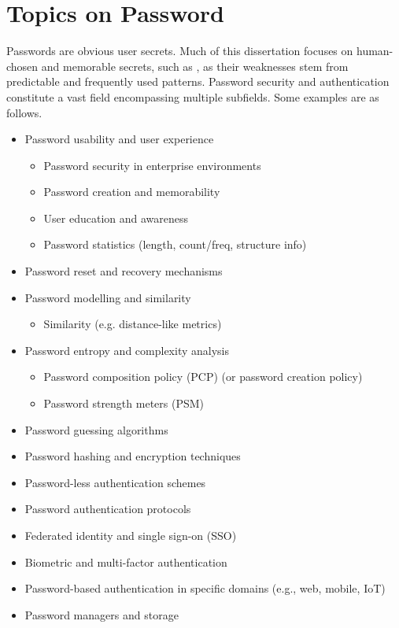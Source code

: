 \section{Topics on Password}
\label{sec::chp2::password}

Passwords are obvious user secrets. Much of this dissertation focuses on human-chosen and memorable secrets, such as , as their weaknesses stem from predictable and frequently used patterns. Password security and authentication constitute a vast field encompassing multiple subfields. Some examples are as follows.


\begin{itemize}
    \item Password usability and user experience
        \begin{itemize}
            \item Password security in enterprise environments
            \item Password creation and memorability
            \item User education and awareness
            \item Password statistics (length, count/freq, structure info)
        \end{itemize}
    \item Password reset and recovery mechanisms
    \item Password modelling and similarity
        \begin{itemize}
            \item Similarity (e.g. distance-like metrics)
        \end{itemize}
    \item Password entropy and complexity analysis 
        \begin{itemize}
            \item Password composition policy (PCP) (or password creation policy)
            \item Password strength meters (PSM)
        \end{itemize}
    \item Password guessing algorithms
    \item Password hashing and encryption techniques
    \item Password-less authentication schemes
    \item Password authentication protocols
    \item Federated identity and single sign-on (SSO)
    \item Biometric and multi-factor authentication
    \item Password-based authentication in specific domains (e.g., web, mobile, IoT)
    \item Password managers and storage
\end{itemize}


